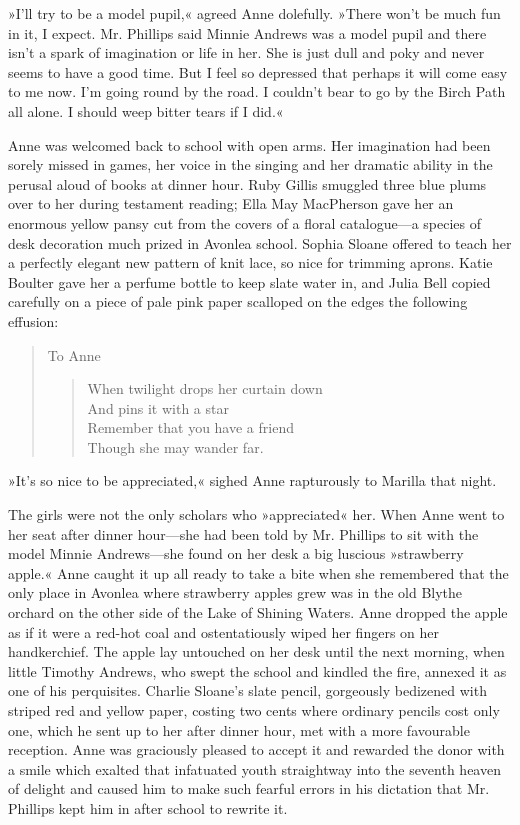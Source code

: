»I’ll try to be a model pupil,« agreed Anne dolefully. »There won’t be much fun in it, I expect. Mr. Phillips said Minnie Andrews was a model pupil and there isn’t a spark of imagination or life in her. She is just dull and poky and never seems to have a good time. But I feel so depressed that perhaps it will come easy to me now. I’m going round by the road. I couldn’t bear to go by the Birch Path all alone. I should weep bitter tears if I did.«

Anne was welcomed back to school with open arms. Her imagination had been sorely missed in games, her voice in the singing and her dramatic ability in the perusal aloud of books at dinner hour. Ruby Gillis smuggled three blue plums over to her during testament reading; Ella May MacPherson gave her an enormous yellow pansy cut from the covers of a floral catalogue—a species of desk decoration much prized in Avonlea school. Sophia Sloane offered to teach her a perfectly elegant new pattern of knit lace, so nice for trimming aprons. Katie Boulter gave her a perfume bottle to keep slate water in, and Julia Bell copied carefully on a piece of pale pink paper scalloped on the edges the following effusion:

\begin{quote}
\noindent To Anne

\begin{verse}
When twilight drops her curtain down\\
And pins it with a star\\
Remember that you have a friend\\
Though she may wander far.
\end{verse}
\end{quote}

»It’s so nice to be appreciated,« sighed Anne rapturously to Marilla that night.

The girls were not the only scholars who »appreciated« her. When Anne went to her seat after dinner hour—she had been told by Mr. Phillips to sit with the model Minnie Andrews—she found on her desk a big luscious »strawberry apple.« Anne caught it up all ready to take a bite when she remembered that the only place in Avonlea where strawberry apples grew was in the old Blythe orchard on the other side of the Lake of Shining Waters. Anne dropped the apple as if it were a red-hot coal and ostentatiously wiped her fingers on her handkerchief. The apple lay untouched on her desk until the next morning, when little Timothy Andrews, who swept the school and kindled the fire, annexed it as one of his perquisites. Charlie Sloane’s slate pencil, gorgeously bedizened with striped red and yellow paper, costing two cents where ordinary pencils cost only one, which he sent up to her after dinner hour, met with a more favourable reception. Anne was graciously pleased to accept it and rewarded the donor with a smile which exalted that infatuated youth straightway into the seventh heaven of delight and caused him to make such fearful errors in his dictation that Mr. Phillips kept him in after school to rewrite it.

